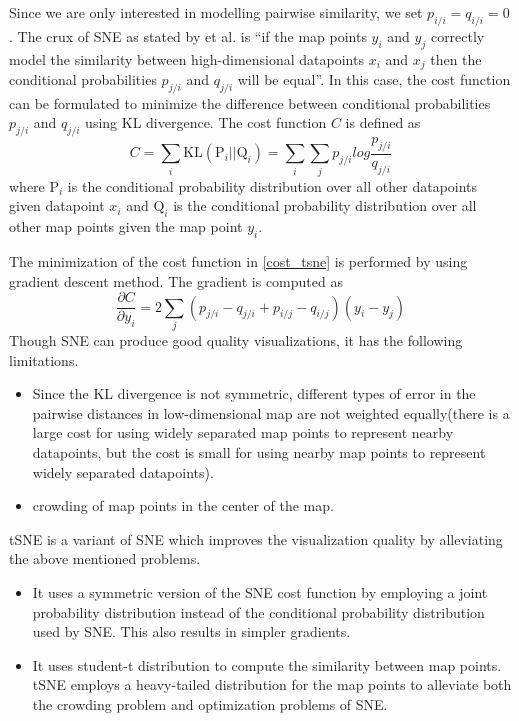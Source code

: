 Since we are only interested in modelling pairwise similarity, we set $p_{i/i} = q_{i/i} = 0$. The crux of SNE as stated by \cite{tsne} et al. is ``if the map points $y_i$ and $y_j$ correctly model the similarity between high-dimensional datapoints $x_i$ and $x_j$ then the conditional probabilities $p_{j/i}$ and $q_{j/i}$ will be equal''. In this case, the cost function can be formulated to minimize the difference between conditional probabilities $p_{j/i}$ and $q_{j/i}$ using KL divergence. The cost function $C$ is defined as
\begin{equation}
C = \sum_{i}\textrm{KL}(\textrm{P}_i \big|\big| \textrm{Q}_i) = \sum_{i}\sum_{j} p_{j/i} log \frac{p_{j/i}}{q_{j/i}}
\label{cost_tsne}
\end{equation}
where $\textrm{P}_i$ is the conditional probability distribution over all other datapoints given datapoint $x_i$ and $\textrm{Q}_i$ is the conditional probability distribution over all other map points given the map point $y_i$.

The minimization of the cost function in \ref{cost_tsne} is performed by using gradient descent method. The gradient is computed as
\[ \frac{\partial C}{\partial y_i} = 2\sum_j(p_{j/i}-q_{j/i} + p_{i/j}-q_{i/j})(y_i - y_j) \]
Though SNE can produce good quality visualizations, it has the following limitations.
\begin{itemize}
\item Since the KL divergence is not symmetric, different types of error in the pairwise distances in low-dimensional map are not weighted equally(there is a large cost for using widely separated map points to represent nearby datapoints, but the cost is small for using nearby map points to represent widely separated datapoints).
\item crowding of map points in the center of the map.
\end{itemize}

tSNE is a variant of SNE which improves the visualization quality by alleviating the above mentioned problems.
\begin{itemize}
\item It uses a symmetric version of the SNE cost function by employing a joint probability distribution instead of the conditional probability distribution used by SNE. This also results in simpler gradients.
\item It uses student-t distribution to compute the similarity between map points. tSNE employs a heavy-tailed distribution for the map points to alleviate both the crowding problem and optimization problems of SNE.
\end{itemize}

